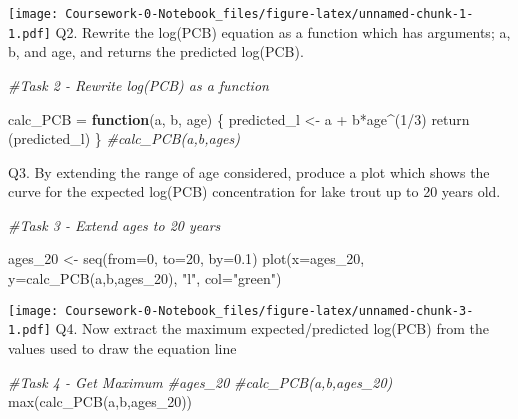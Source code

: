 \documentclass[
]{article}
\newenvironment{Shaded}{\begin{snugshade}}{\end{snugshade}}
\newcommand{\AttributeTok}[1]{\textcolor[rgb]{0.77,0.63,0.00}{#1}}
\newcommand{\CommentTok}[1]{\textcolor[rgb]{0.56,0.35,0.01}{\textit{#1}}}
\newcommand{\ControlFlowTok}[1]{\textcolor[rgb]{0.13,0.29,0.53}{\textbf{#1}}}
\newcommand{\DecValTok}[1]{\textcolor[rgb]{0.00,0.00,0.81}{#1}}
\newcommand{\FloatTok}[1]{\textcolor[rgb]{0.00,0.00,0.81}{#1}}
\newcommand{\FunctionTok}[1]{\textcolor[rgb]{0.00,0.00,0.00}{#1}}
\newcommand{\NormalTok}[1]{#1}
\newcommand{\OtherTok}[1]{\textcolor[rgb]{0.56,0.35,0.01}{#1}}
\newcommand{\SpecialCharTok}[1]{\textcolor[rgb]{0.00,0.00,0.00}{#1}}
\newcommand{\StringTok}[1]{\textcolor[rgb]{0.31,0.60,0.02}{#1}}
\begin{document}
\texttt{[image: Coursework-0-Notebook\_files/figure-latex/unnamed-chunk-1-1.pdf]}
Q2. Rewrite the log(PCB) equation as a function which has arguments; a,
b, and age, and returns the predicted log(PCB).

\begin{Shaded}
\begin{Highlighting}[]
\CommentTok{\#Task 2 {-} Rewrite log(PCB) as a function}

\NormalTok{calc\_PCB }\OtherTok{=} \ControlFlowTok{function}\NormalTok{(a, b, age) \{}
\NormalTok{  predicted\_l }\OtherTok{\textless{}{-}}\NormalTok{ a }\SpecialCharTok{+}\NormalTok{ b}\SpecialCharTok{*}\NormalTok{age}\SpecialCharTok{\^{}}\NormalTok{(}\DecValTok{1}\SpecialCharTok{/}\DecValTok{3}\NormalTok{)}
  \FunctionTok{return}\NormalTok{ (predicted\_l)}
\NormalTok{\}}
\CommentTok{\#calc\_PCB(a,b,ages)}
\end{Highlighting}
\end{Shaded}

Q3. By extending the range of age considered, produce a plot which shows
the curve for the expected log(PCB) concentration for lake trout up to
20 years old.

\begin{Shaded}
\begin{Highlighting}[]
\CommentTok{\#Task 3 {-} Extend ages to 20 years}

\NormalTok{ages\_20 }\OtherTok{\textless{}{-}} \FunctionTok{seq}\NormalTok{(}\AttributeTok{from=}\DecValTok{0}\NormalTok{, }\AttributeTok{to=}\DecValTok{20}\NormalTok{, }\AttributeTok{by=}\FloatTok{0.1}\NormalTok{)}
\FunctionTok{plot}\NormalTok{(}\AttributeTok{x=}\NormalTok{ages\_20, }\AttributeTok{y=}\FunctionTok{calc\_PCB}\NormalTok{(a,b,ages\_20), }\StringTok{"l"}\NormalTok{, }\AttributeTok{col=}\StringTok{"green"}\NormalTok{)}
\end{Highlighting}
\end{Shaded}

\texttt{[image: Coursework-0-Notebook\_files/figure-latex/unnamed-chunk-3-1.pdf]}
Q4. Now extract the maximum expected/predicted log(PCB) from the values
used to draw the equation line

\begin{Shaded}
\begin{Highlighting}[]
\CommentTok{\#Task 4 {-} Get Maximum}
\CommentTok{\#ages\_20}
\CommentTok{\#calc\_PCB(a,b,ages\_20)}
\FunctionTok{max}\NormalTok{(}\FunctionTok{calc\_PCB}\NormalTok{(a,b,ages\_20))}
\end{Highlighting}
\end{Shaded}
\end{document}
